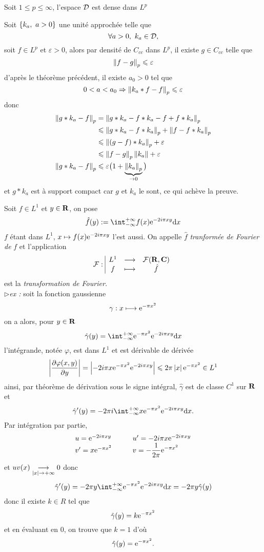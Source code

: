 \documentclass[a4paper,11pt, twoside]{article}
\begin{document}
\begin{prop}
  Soit $1\leqslant p\leqslant \infty$, l'espace $\mathcal D$ est dense dans $L^p$
\end{prop}


\begin{Proof}
  Soit $\left\{k_a,\ a>0\right\}$ une unité approchée telle que 
  $$\forall a>0,\ k_a\in \mathcal D,$$
  soit $f\in L^p$ et $\varepsilon>0$, alors par densité de $C_{cc}$ dans $L^p$, il existe $g\in C_{cc}$ telle que 
  $$\left\lVert f-g\right\rVert_p\leqslant \varepsilon$$
  d'après le théorème précédent, il existe $a_0>0$ tel que 
  $$0<a<a_0\Rightarrow\left\lVert k_a*f-f\right\rVert_p\leqslant \varepsilon$$
  donc 
  \begin{align*}
    \left\lVert g*k_a-f\right\rVert_p&=\left\lVert g*k_a-f*k_a-f+f*k_a\right\rVert_p\\
    &\leqslant \left\lVert g*k_a-f*k_a\right\rVert_p+\left\lVert f-f*k_a\right\rVert_p\\
    &\leqslant \left\lVert\left(g-f\right)*k_a\right\rVert_p+\varepsilon\\
    &\leqslant \left\lVert f-g\right\rVert_p\left\lVert k_a\right\rVert+\varepsilon\\
    \left\lVert g*k_a-f\right\rVert_p&\leqslant \varepsilon\big(1+\underbrace{\left\lVert k_a\right\rVert_p}_{\to 0}\big)
  \end{align*}
  et $g*k_a$ est à support compact car $g$ et $k_a$ le sont, ce qui achève la preuve.
\end{Proof}




Soit $f\in L^1$ et $y\in \mathbf R$, on pose 
$$\hat f(y):=\intr f(x)\ex{-2i\pi xy}\dx$$
$f$ étant dans $L^1$, $x\mapsto f(x)\mathrm{e}^{-2i\pi xy}$ l'est aussi. On appelle $\hat f$ \emph{tranformée de Fourier de }$f$ et l'application 
$$\mathcal F:\begin{array}{|ccc}
  L^1&\longrightarrow&\mathcal{F}(\mathbf R,\mathbf C)\\
  f&\longmapsto& \hat f
\end{array}$$
est la \emph{transformation de Fourier.}\\


$\triangleright$\emph{ex :} soit la fonction gaussienne 
$$\gamma:x\longmapsto \mathrm{e}^{-\pi x^2}$$
on a alors, pour $y\in\mathbf R$
$$\hat \gamma (y)=\intr\ex{-\pi x^2}\ex{-2i\pi xy}\dx$$
l'intégrande, notée $\varphi$, est dans $L^1$ et est dérivable de dérivée  
$$\left| \frac{\partial \varphi(x,y)}{\partial y}\right|=\left| -2i\pi x\mathrm{e}^{-\pi x^2}\mathrm{e}^{-2i\pi xy}\right|\leqslant 2\pi\left| x\right|\mathrm{e}^{-\pi x^2}\in L^1$$
ainsi, par théorème de dérivation sous le signe intégral, $\hat\gamma$ est de classe $C^1$ sur $\mathbf R$ et 
$$\hat \gamma'(y)=-2\pi i\intr x\ex{-\pi x^2}\ex{-2i\pi xy}\dx.$$
Par intégration par partie, 
$$\begin{array}{lllc}
  &u=\mathrm{e}^{-2i\pi xy}\qquad &u'=-2i\pi x\mathrm{e}^{-2i\pi xy}&\\
  &v'=x\mathrm{e}^{-\pi x^2}&v=-\displaystyle\frac{1}{2\pi}\mathrm{e}^{-\pi x^2}&
\end{array}$$
et $uv(x)\underset{\left| x\right|\to +\infty}{\longrightarrow}0$ donc 
$$\hat \gamma'(y)=-2\pi y\intr \ex{-\pi x^2}\ex{-2i\pi xy}\dx=-2\pi y\hat \gamma(y)$$
donc il existe $k\in R$ tel que 
$$\hat\gamma (y)=k\mathrm{e}^{-\pi x^2}$$
et en évaluant en $0$, on trouve que $k=1$ d'où 
$$\hat\gamma (y)=\mathrm{e}^{-\pi x^2}.$$
\end{document}
